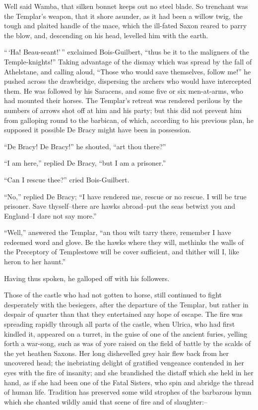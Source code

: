 Well said Wamba, that silken bonnet keeps out no steel blade. So
trenchant was the Templar's weapon, that it shore asunder, as it had
been a willow twig, the tough and plaited handle of the mace, which the
ill-fated Saxon reared to parry the blow, and, descending on his head,
levelled him with the earth.

``\,`Ha! Beau-seant!'\,'' exclaimed Bois-Guilbert, ``thus be it to the
maligners of the Temple-knights!'' Taking advantage of the dismay which
was spread by the fall of Athelstane, and calling aloud, ``Those who
would save themselves, follow me!'' he pushed across the drawbridge,
dispersing the archers who would have intercepted them. He was followed
by his Saracens, and some five or six men-at-arms, who had mounted their
horses. The Templar's retreat was rendered perilous by the numbers of
arrows shot off at him and his party; but this did not prevent him from
galloping round to the barbican, of which, according to his previous
plan, he supposed it possible De Bracy might have been in possession.

``De Bracy! De Bracy!'' he shouted, ``art thou there?''

``I am here,'' replied De Bracy, ``but I am a prisoner.''

``Can I rescue thee?'' cried Bois-Guilbert.

``No,'' replied De Bracy; ``I have rendered me, rescue or no rescue. I
will be true prisoner. Save thyself--there are hawks abroad--put the
seas betwixt you and England--I dare not say more.''

``Well,'' answered the Templar, ``an thou wilt tarry there, remember I
have redeemed word and glove. Be the hawks where they will, methinks the
walls of the Preceptory of Templestowe will be cover sufficient, and
thither will I, like heron to her haunt.''

Having thus spoken, he galloped off with his followers.

Those of the castle who had not gotten to horse, still continued to
fight desperately with the besiegers, after the departure of the
Templar, but rather in despair of quarter than that they entertained any
hope of escape. The fire was spreading rapidly through all parts of the
castle, when Ulrica, who had first kindled it, appeared on a turret, in
the guise of one of the ancient furies, yelling forth a war-song, such
as was of yore raised on the field of battle by the scalds of the yet
heathen Saxons. Her long dishevelled grey hair flew back from her
uncovered head; the inebriating delight of gratified vengeance contended
in her eyes with the fire of insanity; and she brandished the distaff
which she held in her hand, as if she had been one of the Fatal Sisters,
who spin and abridge the thread of human life. Tradition has preserved
some wild strophes of the barbarous hymn which she chanted wildly amid
that scene of fire and of slaughter:--

